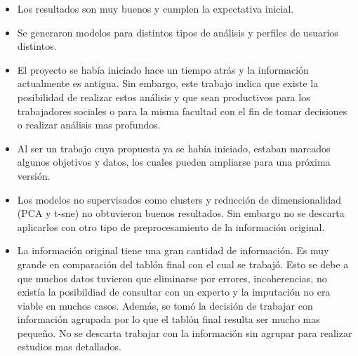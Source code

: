 \begin{itemize}
	\item 
	Los resultados son muy buenos y cumplen la expectativa inicial.
	\item 
	Se generaron modelos para distintos tipos de análisis y perfiles de usuarios distintos.
	\item 
	El proyecto se había iniciado hace un tiempo atrás y la información actualmente es antigua. Sin embargo, este trabajo indica que existe la posibilidad de realizar estos análisis y que sean productivos para los trabajadores sociales o para la misma facultad con el fin de tomar decisiones o realizar análisis mas profundos.
	\item 
	Al ser un trabajo cuya propuesta ya se había iniciado, estaban marcados algunos objetivos y datos, los cuales pueden ampliarse para una próxima versión.
	\item 
	Los modelos no supervisados como clusters y reducción de dimensionalidad (PCA y t-sne) no obtuvieron buenos resultados. Sin embargo no se descarta aplicarlos con otro tipo de preprocesamiento de la información original.
	\item 
	La información original tiene una gran cantidad de información. Es muy grande en comparación del tablón final con el cual se trabajó. Esto se debe a que muchos datos tuvieron que eliminarse por errores, incoherencias, no existía la posibildiad de consultar con un experto y la imputación no era viable en muchos casos. Además, se tomó la decisión de trabajar con información agrupada por lo que el tablón final resulta ser mucho mas pequeño. No se descarta trabajar con la información sin agrupar para realizar estudios mas detallados.
\end{itemize}
